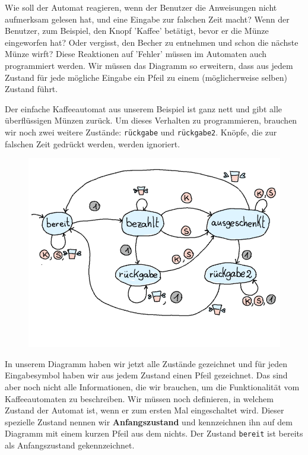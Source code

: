 \documentclass{article}
\begin{document}
Wie soll der Automat reagieren, wenn der Benutzer die Anweisungen nicht aufmerksam gelesen hat, und eine Eingabe zur falschen Zeit macht? Wenn der Benutzer, zum Beispiel, den Knopf 'Kaffee' betätigt, bevor er die Münze eingeworfen hat? Oder vergisst, den Becher zu entnehmen und schon die nächste Münze wirft? Diese Reaktionen auf 'Fehler' müssen im Automaten auch programmiert werden. Wir müssen das Diagramm so erweitern, dass aus jedem Zustand für jede mögliche Eingabe ein Pfeil zu einem (möglicherweise selben) Zustand führt.

Der einfache Kaffeeautomat aus unserem Beispiel ist ganz nett und gibt alle überflüssigen Münzen zurück. Um dieses Verhalten zu programmieren, brauchen wir noch zwei weitere Zustände: \texttt{rückgabe} und \texttt{rückgabe2}.
Knöpfe, die zur falschen Zeit gedrückt werden, werden ignoriert.

\begin{figure}[H]
\centering
\includegraphics[width=\linewidth]{Pictures/Getraenkeautomat.png}
\end{figure}

In unserem Diagramm haben wir jetzt alle Zustände gezeichnet und für jeden Eingabesymbol haben wir aus jedem Zustand einen Pfeil gezeichnet.  Das sind aber noch nicht alle Informationen, die wir brauchen, um die Funktionalität vom Kaffeeautomaten zu beschreiben. Wir müssen noch definieren, in welchem Zustand der Automat ist, wenn er zum ersten Mal eingeschaltet wird. Dieser spezielle Zustand nennen wir \textbf{Anfangszustand} und kennzeichnen ihn auf dem Diagramm mit einem kurzen Pfeil aus dem nichts. Der Zustand \texttt{bereit} ist bereits als Anfangszustand gekennzeichnet.
\end{document}
